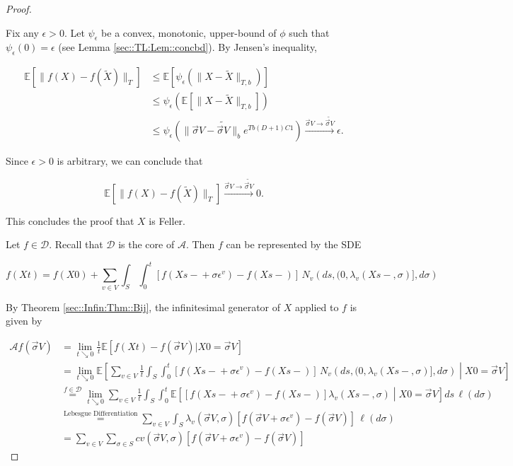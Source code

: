\documentclass[12pt]{article}
\newcommand{\mb}{\mathbb}
\newcommand{\mc}{\mathcal}
\newcommand{\ra}{\rightarrow}
\newcommand{\os}{\overset}
\newcommand{\te}{\text}
\newcommand{\ep}{\epsilon}
\newcommand{\ind}{\hspace{24pt}}
\newcommand{\ex}[1]{\mb{E}\left[#1\right]}			%
\renewcommand{\v}{v}							%
\renewcommand{\S}{S}							%
\newcommand{\s}{\sigma}							%
\newcommand{\sv}{\vec{\s}}						%
\renewcommand{\b}{b}							%
\newcommand{\ev}[1]{\ep^{#1}}					%
\newcommand{\T}{T}								%
\renewcommand{\t}{t}							%
\renewcommand{\tt}{s}							%
\newcommand{\X}{X}								%
\newcommand{\IG}{\mc{A}}						%
\newcommand{\IGr}{c}							%
\newcommand{\const}{C}							%
\newcommand{\degr}{D}							%
\newcommand{\poiss}[1]{N_{#1}}						%
\newcommand{\core}{\mc{D}}							%
\newcommand{\XState}[1]{\S^{#1}}				%
\newcommand{\rate}[1]{\lambda_{#1}}					%
\newcommand{\Sm}{\ell}								%
\newcommand{\alt}{\widetilde}						%
\begin{document}
\begin{proof}
\begin{enumerate}[(a)]
\ind Fix any \(\ep > 0\). Let \(\psi_\ep\) be a convex, monotonic, upper-bound of \(\phi\) such that \(\psi_\ep(0) = \ep\) (see Lemma \ref{sec::TL:Lem::concbd}). By Jensen's inequality,

\begin{align*}
\ex{\|f(\X{}{}) - f(\alt{\X{}{}})\|_\T} &\leq \ex{\psi_\ep\left(\|\X{}{} - \alt{\X{}{}}\|_{\T,\b{}}\right)}\\
&\leq \psi_\ep\left(\ex{\|\X{}{} - \alt{\X{}{}}\|_{\T,\b{}}}\right)\\
&\leq \psi_\ep\left(\|\sv{}{ V} - \alt{\sv{}{ V}}\|_{\b{}}e^{\T\b{}(\degr+1)\const{1}}\right) \os{\sv{}{ V} \ra\alt{\sv{}{ V}}}{\ra} \ep.
\end{align*}

Since \(\ep > 0\) is arbitrary, we can conclude that 

\[\ex{\|f(\X{}{}) - f(\alt{\X{}{}})\|_\T} \os{\sv{}{ V} \ra\alt{\sv{}{ V}}}{\ra} 0.\]

This concludes the proof that \(\X{}{}\) is Feller.
\end{enumerate}

Let \(f \in \core\). Recall that \(\core\) is the core of \(\IG\). Then \(f\) can be represented by the SDE

\[f(\X{}{\t}) = f(\X{}{0}) + \sum_{\v \in  V} \int_\S\int_0^\t [f(\X{}{\tt-} + \s\ev{\v}) - f(\X{}{\tt-})]\,\poiss{\v}\left(d\tt,(0,\rate{\v}(\X{}{\tt-},\s)],d\s\right)\]


By Theorem \ref{sec::Infin:Thm::Bij}, the infinitesimal generator of \(\X{}{}\) applied to \(f\) is given by 

\begin{align*}
\IG f(\sv{}{ V}) &= \lim_{\t \searrow 0} \frac{1}{\t} \ex{f(\X{}{\t}) - f(\sv{}{ V})|\X{}{0} = \sv{}{ V}}\\
&= \lim_{\t \searrow 0} \ex{\sum_{\v \in  V} \frac{1}{\t}\int_\S\int_0^\t \left[f(\X{}{\tt-} + \s\ev{\v}) - f(\X{}{\tt-})\right]\,\poiss{\v}\left(d\tt,(0,\rate{\v}(\X{}{\tt-},\s)],d\s\right)\middle|\X{}{0} = \sv{}{ V}}\\
&\os{f \in \mc{D}}{=} \lim_{\t \searrow 0}\sum_{\v \in  V} \frac{1}{\t}\int_\S\int_0^\t \ex{\left[f(\X{}{\tt-} + \s\ev{\v}) - f(\X{}{\tt-})\right]\rate{\v}(\X{}{\tt-},\s)\middle|\X{}{0} = \sv{}{ V}}d\tt\,\Sm(d\s)\\
&\os{\te{Lebesgue Differentiation}}{=} \sum_{\v \in  V} \int_\S \rate{\v}(\sv{}{ V},\s)[f(\sv{}{ V} + \s\ev{\v}) - f(\sv{}{ V})]\,\Sm(d\s)\\
&= \sum_{\v \in  V} \sum_{\s \in \S} \IGr{\v}(\sv{}{ V},\s)[f(\sv{}{ V} + \s\ev{\v}) - f(\sv{}{ V})]
\end{align*}
\end{proof}
\end{document}

